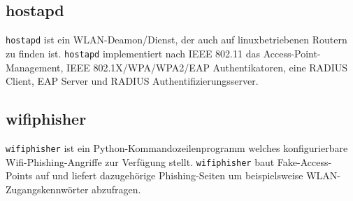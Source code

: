\subsection{hostapd}
\colorbox{altgray}{\lstinline|hostapd|} ist ein WLAN-Deamon/Dienst, der auch auf linuxbetriebenen Routern zu finden ist. \colorbox{altgray}{\lstinline|hostapd|} implementiert nach IEEE 802.11 das Access-Point-Management, IEEE 802.1X/WPA/WPA2/EAP Authentikatoren, eine RADIUS Client, EAP Server und RADIUS Authentifizierungsserver.
\subsection{wifiphisher}
\colorbox{altgray}{\lstinline|wifiphisher|} ist ein Python-Kommandozeilenprogramm welches konfigurierbare Wifi-Phishing-Angriffe zur Verfügung stellt. \colorbox{altgray}{\lstinline|wifiphisher|} baut Fake-Access-Points auf und liefert dazugehörige Phishing-Seiten um beispielsweise WLAN-Zugangskennwörter abzufragen.


